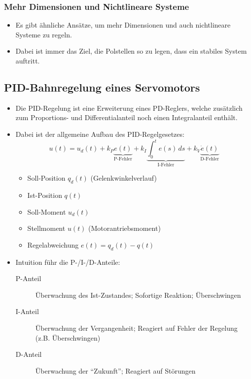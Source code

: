 \documentclass[a4paper, 11pt, accentcolor = tud3b]{tudreport}
\begin{document}
				\subsubsection{Mehr Dimensionen und Nichtlineare Systeme}
					\begin{itemize}
						\item Es gibt ähnliche Ansätze, um mehr Dimensionen und auch nichtlineare Systeme zu regeln.
						\item Dabei ist immer das Ziel, die Polstellen so zu legen, dass ein stabiles System auftritt.
					\end{itemize}

            \subsection{PID-Bahnregelung eines Servomotors} %
                \begin{itemize}
                	\item Die PID-Regelung ist eine Erweiterung eines PD-Reglers, welche zusätzlich zum Proportions- und Differentialanteil noch einen Integralanteil enthält.
                	\item Dabei ist der allgemeine Aufbau des PID-Regelgesetzes:
	                	\begin{equation*}
		                	u(t) = u _ d (t) + k _ P \underbrace{e(t)}_{\text{P-Fehler}} + k _ I \underbrace{\int_{0}^{t} \! e(s) \, ds}_{\text{I-Fehler}} + k _ V \underbrace{\dot{e} (t)}_{\text{D-Fehler}}
	                	\end{equation*}
	                	\begin{itemize}
	                		\item Soll-Position \( q _ d (t) \) (Gelenkwinkelverlauf)
	                		\item Ist-Position \( q (t) \)
	                		\item Soll-Moment \( u _ d (t) \)
	                		\item Stellmoment \( u(t) \) (Motorantriebsmoment)
	                		\item Regelabweichung \( e(t) = q _ d (t) - q(t) \)
	                	\end{itemize}
	                \item Intuition führ die P-/I-/D-Anteile:
		                \begin{description}
		                	\item[P-Anteil] Überwachung des Ist-Zustandes; Sofortige Reaktion; Überschwingen
		                	\item[I-Anteil] Überwachung der Vergangenheit; Reagiert auf Fehler der Regelung (z.B. Überschwingen)
		                	\item[D-Anteil] Überwachung der \enquote{Zukunft}; Reagiert auf Störungen
		                \end{description}
                \end{itemize}
\end{document}
